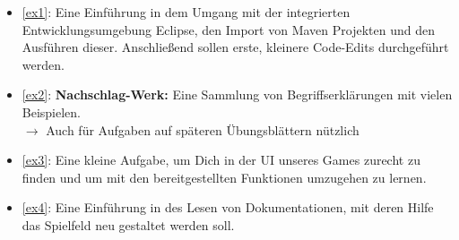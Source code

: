 \begin{itemize}
	\item \ref{ex1}: Eine Einführung in dem Umgang mit der integrierten Entwicklungsumgebung Eclipse, den Import von Maven Projekten und den Ausführen dieser. Anschließend sollen erste, kleinere Code-Edits durchgeführt werden.
	\item \ref{ex2}: \textbf{Nachschlag-Werk:} Eine Sammlung von Begriffserklärungen mit vielen Beispielen.\\
	$\rightarrow$ Auch für Aufgaben auf späteren Übungsblättern nützlich
	\item \ref{ex3}: Eine kleine Aufgabe, um Dich in der UI unseres Games zurecht zu finden und um mit den bereitgestellten Funktionen umzugehen zu lernen.
	\item \ref{ex4}: Eine Einführung in des Lesen von Dokumentationen, mit deren Hilfe das Spielfeld neu gestaltet werden soll.
\end{itemize}